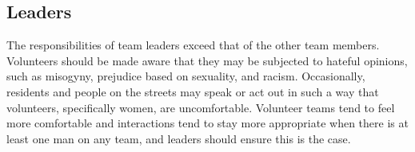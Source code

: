 
\subsection{Leaders}

    The responsibilities of team leaders exceed that of the other team members.
    Volunteers should be made aware that they may be subjected to hateful opinions, such as misogyny, prejudice based on sexuality, and racism.
    Occasionally, residents and people on the streets may speak or act out in such a way that volunteers, specifically women, are uncomfortable.
    Volunteer teams tend to feel more comfortable and interactions tend to stay more appropriate when there is at least one man on any team, and leaders should ensure this is the case.




